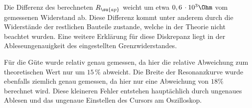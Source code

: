 Die Differenz des berechneten $R_\su{ap}$ weicht um etwa $0,6\,\cdot10^3 \Ohm$
vom gemessenen Widerstand ab. Diese Differenz kommt unter anderem durch die Widerstände
der restlichen Bauteile zustande, welche in der Theorie nicht beachtet wurden.
Eine weitere Erklärung für diese Diskrepanz liegt in der Ableseungenauigkeit
des eingestellten Grenzwiderstandes.

Für die Güte wurde relativ genau gemessen, da hier die relative Abweichung zum
theoretischen Wert nur um $15\,\si{\percent}$ abweicht.
Die Breite der Resonanzkurve wurde ebenfalls ziemlich genau gemessen, da hier
nur eine Abweichung von $18\si{\percent}$ berechnet wird.
Diese kleineren Fehler entstehen hauptächlich durch ungenaues Ablesen und das
ungenaue Einstellen des Cursors am Oszilloskop.
